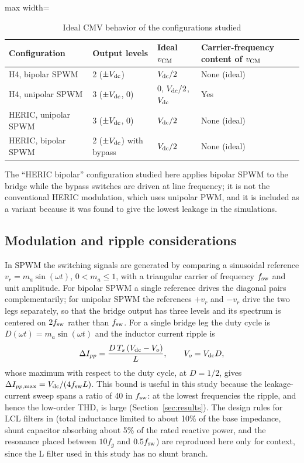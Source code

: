 \begin{table}[!t]
\renewcommand{\arraystretch}{1.2}
\caption{Ideal CMV behavior of the configurations studied}
\label{tab:cmv}
\centering
\footnotesize
\begin{adjustbox}{max width=\columnwidth}
\begin{tabular}{p{3.0cm}p{2.8cm}p{2.4cm}p{3.0cm}}
\toprule
Configuration & Output levels & Ideal $v_{\mathrm{CM}}$ & Carrier-frequency content of $v_{\mathrm{CM}}$ \\
\midrule
H4, bipolar SPWM & 2 ($\pm V_{\mathrm{dc}}$) & $V_{\mathrm{dc}}/2$ & None (ideal) \\
H4, unipolar SPWM & 3 ($\pm V_{\mathrm{dc}}$, 0) & $0$, $V_{\mathrm{dc}}/2$, $V_{\mathrm{dc}}$ & Yes \\
HERIC, unipolar SPWM & 3 ($\pm V_{\mathrm{dc}}$, 0) & $V_{\mathrm{dc}}/2$ & None (ideal) \\
HERIC, bipolar SPWM & 2 ($\pm V_{\mathrm{dc}}$) with bypass & $V_{\mathrm{dc}}/2$ & None (ideal) \\
\bottomrule
\end{tabular}
\end{adjustbox}
\end{table}

The ``HERIC bipolar'' configuration studied here applies bipolar SPWM to the bridge while the bypass switches are driven at line frequency; it is not the conventional HERIC modulation, which uses unipolar PWM, and it is included as a variant because it was found to give the lowest leakage in the simulations.

\subsection{Modulation and ripple considerations}
In SPWM the switching signals are generated by comparing a sinusoidal reference $v_r=m_a\sin(\omega t)$, $0<m_a\le1$, with a triangular carrier of frequency $f_{\mathrm{sw}}$ and unit amplitude. For bipolar SPWM a single reference drives the diagonal pairs complementarily; for unipolar SPWM the references $+v_r$ and $-v_r$ drive the two legs separately, so that the bridge output has three levels and its spectrum is centered on $2f_{\mathrm{sw}}$ rather than $f_{\mathrm{sw}}$. For a single bridge leg the duty cycle is $D(\omega t)=m_a\sin(\omega t)$ and the inductor current ripple is
\begin{equation}
\Delta I_{pp}=\frac{D\,T_s\,(V_{\mathrm{dc}}-V_{o})}{L},\qquad V_o=V_{\mathrm{dc}} D,
\label{eq:ripple}
\end{equation}
whose maximum with respect to the duty cycle, at $D=1/2$, gives $\Delta I_{pp,\max}=V_{\mathrm{dc}}/(4f_{\mathrm{sw}} L)$. This bound is useful in this study because the leakage-current sweep spans a ratio of 40 in $f_{\mathrm{sw}}$: at the lowest frequencies the ripple, and hence the low-order THD, is large (Section~\ref{sec:results}). The design rules for LCL filters in \cite{Reznik2014} (total inductance limited to about 10\% of the base impedance, shunt capacitor absorbing about 5\% of the rated reactive power, and the resonance placed between $10f_g$ and $0.5f_{\mathrm{sw}}$) are reproduced here only for context, since the L filter used in this study has no shunt branch.

